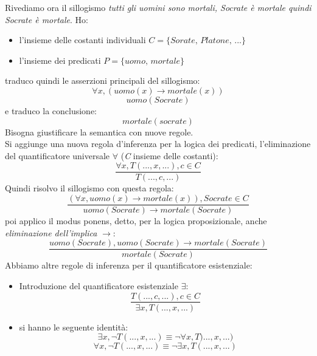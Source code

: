 \documentclass[a4paper,12pt, oneside]{book}
\begin{document}
Rivediamo ora il sillogismo \textit{tutti gli uomini sono mortali, Socrate è mortale quindi Socrate è mortale}. Ho:
\begin{itemize}
	\item l'insieme delle costanti individuali $C=\{Sorate,\, Platone,\,...\}$
	\item l'insieme dei predicati $P=\{uomo,\,mortale\}$
\end{itemize}
traduco quindi le asserzioni principali del sillogismo:
$$\forall x, (uomo(x)\to mortale(x))$$
$$uomo(Socrate)$$
e traduco la conclusione:
$$mortale(socrate)$$
Bisogna giustificare la semantica con nuove regole.\\
Si aggiunge una nuova regola d'inferenza per la logica dei predicati, l'eliminazione del quantificatore universale $\forall$ (\textit{C} insieme delle costanti):
$$\frac{\forall x, T(...,x,...), c\in C}{T(...,c,...)}$$
Quindi risolvo il sillogismo con questa regola:
$$\frac{(\forall x, uomo(x)\to mortale(x)), Socrate\in C}{uomo(Socrate)\to mortale(Socrate)}$$
poi applico il modus ponens, detto, per la logica proposizionale, anche \textit{eliminazione dell'implica} $\to$:
$$\frac{uomo(Socrate), uomo(Socrate)\to mortale(Socrate)}{mortale(Socrate)}$$
Abbiamo altre regole di inferenza per il quantificatore esistenziale:
\begin{itemize}
	\item Introduzione del quantificatore esistenziale $\exists$:
	      $$\frac{T(...,c,...), c\in C}{\exists x, T(...,x,...)}$$
	\item si hanno le seguente identità:
	      $$\exists x, \neg T(...,x,...)\equiv \neg\forall x, T)...,x,...)$$
	      $$\forall x, \neg T(...,x,...)\equiv \neg\exists x, T(...,x,...)$$
\end{itemize}
\end{document}
